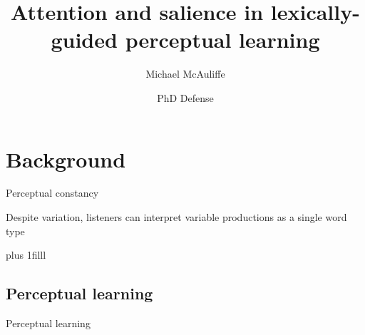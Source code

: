 \documentclass{beamer}
\title
{Attention and salience in lexically-guided perceptual learning}
\author
{Michael McAuliffe}
\institute
{}
\date
{PhD Defense}
\newcommand{\btVFill}{\vskip0pt plus 1filll}
\begin{document}
\begin{frame}
  \titlepage
\end{frame}

\section{Background}

\begin{frame}{Perceptual constancy}
\vfill
\begin{center}
Despite variation, listeners can interpret variable productions as a single word type
\vfill
{}

\end{center}
\btVFill

\begin{flushright}
\scriptsize
\citet{Shankweiler1977, Kuhl1979,Sumner2013}
\end{flushright}
\end{frame}

\subsection{Perceptual learning}

\begin{frame}{Perceptual learning}
\hfill
{}

\end{frame}
\end{document}
